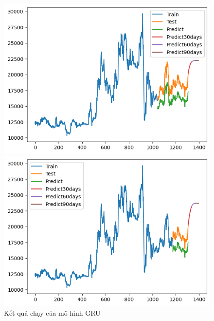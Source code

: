 \begin{figure}[H]
\begin{minipage}{0.15\textwidth}
    \end{minipage}
    \hfill
    \begin{minipage}{0.15\textwidth}
    \centering
    \includegraphics[width=1\textwidth]{resources/chapter-5/newdata1/result/EXIM_GRU_8_2.png}
    \end{minipage}
    \hfill
        \begin{minipage}{0.15\textwidth}
    \centering
    \includegraphics[width=1\textwidth]{resources/chapter-5/newdata1/result/EXIM_GRU_9_1.png}
    \end{minipage}
    \hfill
    
    \caption{Kết quả chạy của mô hình GRU}
    \label{fig:GRU}
\end{figure}



